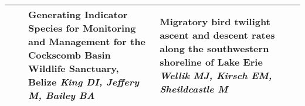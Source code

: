 \begin{tabular}{|x{0.75cm}|a{2.25cm}|x{2.25cm}|x{2.25cm}|x{2.25cm}|x{2.25cm}|}
\hline
{}& \newline \newline \textit{} & Generating Indicator Species for Monitoring and Management for the Cockscomb Basin Wildlife Sanctuary, Belize \newline \newline \textit{King DI, Jeffery M, Bailey BA} & Migratory bird twilight ascent and descent rates along the southwestern shoreline of Lake Erie \newline \newline \textit{Wellik MJ, Kirsch EM, Sheildcastle M}\\
\hline
\end{tabular}
